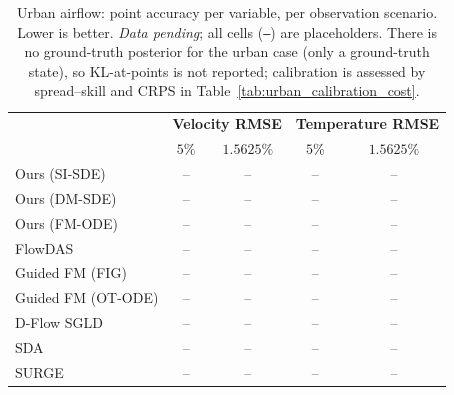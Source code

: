 \begin{table}[ht]
    \centering
    \small
    \caption{Urban airflow: point accuracy per variable, per observation scenario. Lower is better. \emph{Data pending}; all cells (\texttt{--}) are placeholders. There is no ground-truth posterior for the urban case (only a ground-truth state), so KL-at-points is not reported; calibration is assessed by spread--skill and CRPS in Table~\ref{tab:urban_calibration_cost}.}
    \label{tab:urban_accuracy}
    \begin{tabular}{l|cc|cc}
        \toprule
        & \multicolumn{2}{c|}{\textbf{Velocity RMSE}}
        & \multicolumn{2}{c}{\textbf{Temperature RMSE}} \\
        & $5\%$ & $1.5625\%$ & $5\%$ & $1.5625\%$ \\
        \midrule
        Ours (SI-SDE) & -- & -- & -- & -- \\
        Ours (DM-SDE) & -- & -- & -- & -- \\
        Ours (FM-ODE) & -- & -- & -- & -- \\
        \midrule
        FlowDAS & -- & -- & -- & -- \\
        Guided FM (FIG) & -- & -- & -- & -- \\
        Guided FM (OT-ODE) & -- & -- & -- & -- \\
        D-Flow SGLD & -- & -- & -- & -- \\
        SDA & -- & -- & -- & -- \\
        SURGE & -- & -- & -- & -- \\
        \bottomrule
    \end{tabular}
\end{table}

